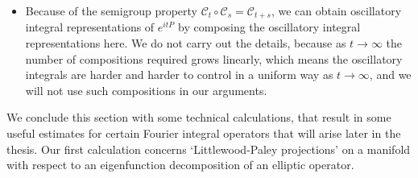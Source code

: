 \begin{itemize}
  \item Because of the semigroup property $\mathcal{C}_t \circ \mathcal{C}_s = \mathcal{C}_{t+s}$, we can obtain oscillatory integral representations of $e^{i t P}$ by composing the oscillatory integral representations here. We do not carry out the details, because as $t \to \infty$ the number of compositions required grows linearly, which means the oscillatory integrals are harder and harder to control in a uniform way as $t \to \infty$, and we will not use such compositions in our arguments.
\end{itemize}
%
We conclude this section with some technical calculations, that result in some useful estimates for certain Fourier integral operators that will arise later in the thesis. Our first calculation concerns `Littlewood-Paley projections' on a manifold with respect to an eigenfunction decomposition of an elliptic operator.

